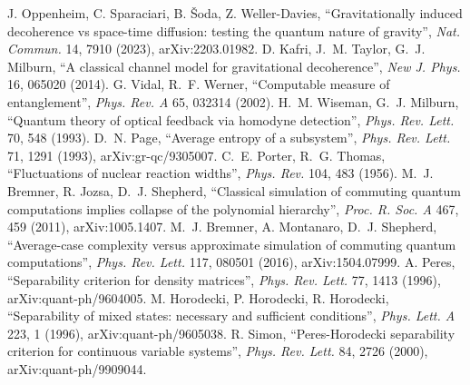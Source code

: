  J. Oppenheim, C. Sparaciari, B. \v{S}oda, Z. Weller-Davies, ``Gravitationally induced decoherence vs space-time diffusion:
testing the quantum nature of gravity'', \emph{Nat. Commun.} 14, 7910 (2023), arXiv:2203.01982.
 D. Kafri, J.~M. Taylor, G.~J. Milburn, ``A classical channel model for gravitational decoherence'', \emph{New J. Phys.} 16,
065020 (2014).
 G. Vidal, R.~F. Werner, ``Computable measure of entanglement'', \emph{Phys. Rev. A} 65, 032314 (2002).
 H.~M. Wiseman, G.~J. Milburn, ``Quantum theory of optical feedback via homodyne detection'', \emph{Phys. Rev. Lett.}
70, 548 (1993).
 D.~N. Page, ``Average entropy of a subsystem'', \emph{Phys. Rev. Lett.} 71, 1291 (1993), arXiv:gr-qc/9305007.
 C.~E. Porter, R.~G. Thomas, ``Fluctuations of nuclear reaction widths'', \emph{Phys. Rev.} 104, 483 (1956).
 M.~J. Bremner, R. Jozsa, D.~J. Shepherd, ``Classical simulation of commuting quantum computations implies collapse of
the polynomial hierarchy'', \emph{Proc. R. Soc. A} 467, 459 (2011), arXiv:1005.1407.
 M.~J. Bremner, A. Montanaro, D.~J. Shepherd, ``Average-case complexity versus approximate simulation of commuting
quantum computations'', \emph{Phys. Rev. Lett.} 117, 080501 (2016), arXiv:1504.07999.
 A. Peres, ``Separability criterion for density matrices'', \emph{Phys. Rev. Lett.} 77, 1413 (1996),
arXiv:quant-ph/9604005.
 M. Horodecki, P. Horodecki, R. Horodecki, ``Separability of mixed states: necessary and sufficient conditions'',
\emph{Phys. Lett. A} 223, 1 (1996), arXiv:quant-ph/9605038.
 R. Simon, ``Peres-Horodecki separability criterion for continuous variable systems'', \emph{Phys. Rev. Lett.} 84, 2726
(2000), arXiv:quant-ph/9909044.
